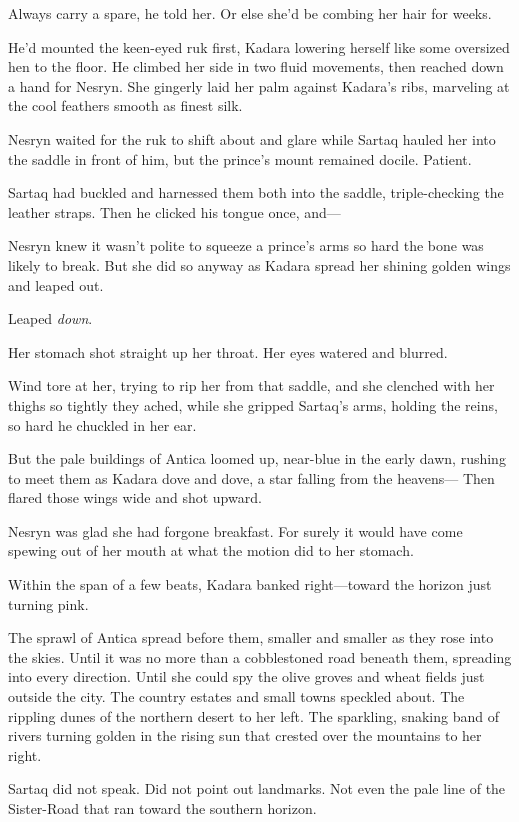 Always carry a spare, he told her.
Or else she'd be combing her hair for weeks.

He'd mounted the keen-eyed ruk first, Kadara lowering herself like some oversized hen to the floor.
He climbed her side in two fluid movements, then reached down a hand for Nesryn.
She gingerly laid her palm against Kadara's ribs, marveling at the cool feathers smooth as finest silk.

Nesryn waited for the ruk to shift about and glare while Sartaq hauled her into the saddle in front of him, but the prince's mount remained docile.
Patient.

Sartaq had buckled and harnessed them both into the saddle, triple-checking the leather straps.
Then he clicked his tongue once, and---

Nesryn knew it wasn't polite to squeeze a prince's arms so hard the bone was likely to break.
But she did so anyway as Kadara spread her shining golden wings and leaped out.

Leaped \emph{down}.

Her stomach shot straight up her throat.
Her eyes watered and blurred.

Wind tore at her, trying to rip her from that saddle, and she clenched with her thighs so tightly they ached, while she gripped Sartaq's arms, holding the reins, so hard he chuckled in her ear.

But the pale buildings of Antica loomed up, near-blue in the early dawn, rushing to meet them as Kadara dove and dove, a star falling from the heavens--- Then flared those wings wide and shot upward.

Nesryn was glad she had forgone breakfast.
For surely it would have come spewing out of her mouth at what the motion did to her stomach.

Within the span of a few beats, Kadara banked right---toward the horizon just turning pink.

The sprawl of Antica spread before them, smaller and smaller as they rose into the skies.
Until it was no more than a cobblestoned road beneath them, spreading into every direction.
Until she could spy the olive groves and wheat fields just outside the city.
The country estates and small towns speckled about.
The rippling dunes of the northern desert to her left.
The sparkling, snaking band of rivers turning golden in the rising sun that crested over the mountains to her right.

Sartaq did not speak.
Did not point out landmarks.
Not even the pale line of the Sister-Road that ran toward the southern horizon.

